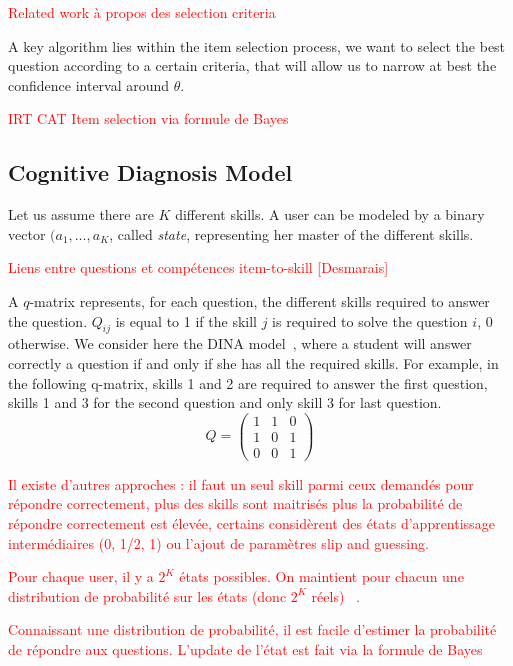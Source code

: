 \documentclass{sig-alternate}
\newcommand\alert[1]{\textcolor{red}{#1}}
\begin{document}
\alert{Related work à propos des selection criteria}

A key algorithm lies within the item selection process, we want to select the best question according to a certain criteria, that will allow us to narrow at best the confidence interval around $\theta$.

\alert{IRT CAT}
\alert{Item selection via formule de Bayes}

\subsection{Cognitive Diagnosis Model}

Let us assume there are $K$ different skills. A user can be modeled by a binary vector $(a_1, \ldots, a_K$, called \emph{state}, representing her master of the different skills. 

\alert{Liens entre questions et compétences item-to-skill [Desmarais]}

A $q$-matrix \cite{Tatsuoka1983} represents, for each question, the different skills required to answer the question. $Q_{ij}$ is equal to 1 if the skill $j$ is required to solve the question $i$, 0 otherwise. We consider here the DINA model~\cite{Desmarais2012}, where a student will answer correctly a question if and only if she has all the required skills. For example, in the following q-matrix, skills 1 and 2 are required to answer the first question, skills 1 and 3 for the second question and only skill 3 for last question. %
\[ Q = \left(\begin{array}{lll}
1 & 1 & 0\\
1 & 0 & 1\\
0 & 0 & 1
\end{array}\right) \]

\alert{Il existe d'autres approches : il faut un seul skill parmi ceux demandés pour répondre correctement, plus des skills sont maitrisés plus la probabilité de répondre correctement est élevée, certains considèrent des états d'apprentissage intermédiaires (0, 1/2, 1) ou l'ajout de paramètres slip and guessing. }

\alert{Pour chaque user, il y a $2^K$ états possibles. On maintient pour chacun une distribution de probabilité sur les états (donc $2^K$ réels) ~\cite{Huebner2010}.}

\alert{Connaissant une distribution de probabilité, il est facile d'estimer la probabilité de répondre aux questions. L'update de l'état est fait via la formule de Bayes}
\end{document}
